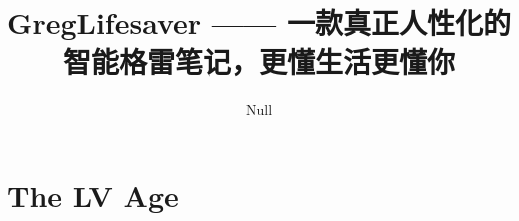 \documentclass[cn,blue,12pt,normal]{elegantnote}
\title{GregLifesaver —— 一款真正人性化的智能格雷笔记，更懂生活更懂你}
\author{Null}
\institute{Nowhere}
\date{\zhtoday}
\begin{document}
\maketitle

\section{The LV Age}

\end{document}
